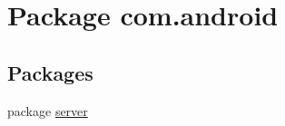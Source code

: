 \hypertarget{namespacecom_1_1android}{\section{Package com.\-android}
\label{namespacecom_1_1android}
}
\subsection*{Packages}
\begin{DoxyCompactItemize}
\item 
package \hyperlink{namespacecom_1_1android_1_1server}{server}
\end{DoxyCompactItemize}
